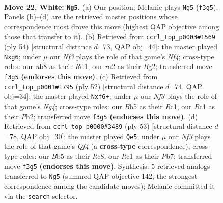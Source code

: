 \documentclass[11pt]{article}
\begin{document}
\clearpage

\begin{figure}[p]\centering
\begin{subfigure}{0.46\textwidth}\centering
\resizebox{\linewidth}{!}{%
\newchessgame
\chessboard[
  setfen={1nb2r1k/2q2p2/1p2p1p1/1B6/3PQ1p1/5N2/r1P2PP1/2RN1K2 w - - 0 22},
  showmover=false,
  pgfstyle=straightmove, color=movearrow, markmove={f3-g5}
]}
\caption{}
\end{subfigure}\hfill
\begin{subfigure}{0.46\textwidth}\centering
\resizebox{\linewidth}{!}{%
\newchessgame
\chessboard[
  setfen={4r1k1/1pq2p2/6p1/p3b2p/Pn3N2/1Q4PP/5PB1/3R2K1 w - - 0 28},
  showmover=false,
  pgfstyle=straightmove, color=movearrow, markmove={f4-g6}
]}
\caption{}
\end{subfigure}
\\[4pt]
\begin{subfigure}{0.46\textwidth}\centering
\resizebox{\linewidth}{!}{%
\newchessgame
\chessboard[
  setfen={1n1q2k1/5p2/1r2pbp1/1p5p/3PB1N1/1Q4P1/5P1P/2R3K1 w - - 0 27},
  showmover=false,
  pgfstyle=straightmove, color=movearrow, markmove={g4-f6}
]}
\caption{}
\end{subfigure}\hfill
\begin{subfigure}{0.46\textwidth}\centering
\resizebox{\linewidth}{!}{%
\newchessgame
\chessboard[
  setfen={2r3k1/pp3p1p/1b3n1B/5qp1/B7/2PQP2P/PP4P1/3R2K1 b - - 2 27},
  showmover=false,
  pgfstyle=straightmove, color=movearrow, markmove={f5-e5}
]}
\caption{}
\end{subfigure}
\caption{\textbf{Move 22, White: \texttt{Ng5}.} (a) Our position; Melanie plays \texttt{Ng5} (\texttt{f3g5}). Panels (b)--(d) are the retrieved master positions whose correspondence most drove this move (highest QAP objective among those that transfer to it). (b) Retrieved from \texttt{ccrl\_top\_p0003\#1569} (ply 54) [structural distance $d$=73, QAP obj=44]: the master played \texttt{Nxg6}; under $\mu$ our \emph{Nf3} plays the role of that game's \emph{Nf4}; cross-type roles: our \emph{n}b8 as their \emph{R}d1, our \emph{r}a2 as their \emph{B}g2; transferred move \texttt{f3g5} \textbf{(endorses this move)}. (c) Retrieved from \texttt{ccrl\_top\_p0001\#1795} (ply 52) [structural distance $d$=74, QAP obj=34]: the master played \texttt{Nxf6+}; under $\mu$ our \emph{Nf3} plays the role of that game's \emph{Ng4}; cross-type roles: our \emph{B}b5 as their \emph{R}c1, our \emph{R}c1 as their \emph{P}h2; transferred move \texttt{f3g5} \textbf{(endorses this move)}. (d) Retrieved from \texttt{ccrl\_top\_p0000\#3489} (ply 53) [structural distance $d$=78, QAP obj=30]: the master played \texttt{Qe5}; under $\mu$ our \emph{Nf3} plays the role of that game's \emph{Qf4} (a \textbf{cross-type} correspondence); cross-type roles: our \emph{B}b5 as their \emph{R}c8, our \emph{R}c1 as their \emph{P}b7; transferred move \texttt{f3g5} \textbf{(endorses this move)}. Synthesis: 5 retrieved analogs transferred to \texttt{Ng5} (summed QAP objective 142, the strongest correspondence among the candidate moves); Melanie committed it via the \texttt{search} selector.}
\label{fig:thought-m42}
\end{figure}
\end{document}
